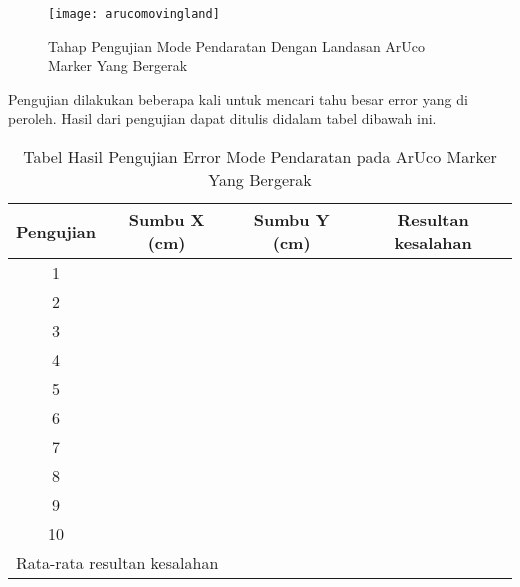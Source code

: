 \begin{packed_enum}
	\begin{figure}[H]
		\centering
		\texttt{[image: arucomovingland]}
		\caption{Tahap Pengujian Mode Pendaratan Dengan Landasan ArUco Marker Yang Bergerak}
		\label{fig:arucomovingland}
	\end{figure}
	
	Pengujian dilakukan beberapa kali untuk mencari tahu besar error yang di peroleh. Hasil dari pengujian dapat ditulis didalam tabel dibawah ini.
	
	\begin{table}[h]
		\label{tab:arucomovingland}
		\centering
		\begin{tabular}{|ccc|c|}
			\hline
			\multicolumn{1}{|c|}{Pengujian} & \multicolumn{1}{c|}{Sumbu X (cm)} & Sumbu Y (cm) & Resultan kesalahan    \\ \hline
			\multicolumn{1}{|c|}{1}         & \multicolumn{1}{c|}{}             &              &                       \\ \hline
			\multicolumn{1}{|c|}{2}         & \multicolumn{1}{c|}{}             &              &                       \\ \hline
			\multicolumn{1}{|c|}{3}         & \multicolumn{1}{c|}{}             &              &                       \\ \hline
			\multicolumn{1}{|c|}{4}         & \multicolumn{1}{c|}{}             &              &                       \\ \hline
			\multicolumn{1}{|c|}{5}         & \multicolumn{1}{c|}{}             &              &                       \\ \hline
			\multicolumn{1}{|c|}{6}         & \multicolumn{1}{c|}{}             &              &                       \\ \hline
			\multicolumn{1}{|c|}{7}         & \multicolumn{1}{c|}{}             &              &                       \\ \hline
			\multicolumn{1}{|c|}{8}         & \multicolumn{1}{c|}{}             &              &                       \\ \hline
			\multicolumn{1}{|c|}{9}         & \multicolumn{1}{c|}{}             &              &                       \\ \hline
			\multicolumn{1}{|c|}{10}        & \multicolumn{1}{c|}{}             &              &                       \\ \hline
			\multicolumn{3}{|l|}{Rata-rata resultan kesalahan}                                 & \multicolumn{1}{l|}{} \\ \hline
		\end{tabular}
		\caption{Tabel Hasil Pengujian Error Mode Pendaratan pada ArUco Marker Yang Bergerak}
	\end{table}
	
\end{packed_enum}
